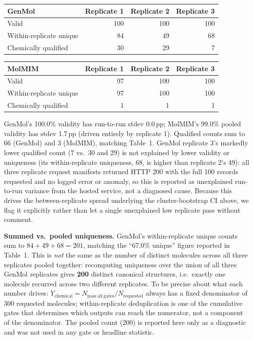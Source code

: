 \documentclass{article}
\begin{document}
\begin{table}[h]
\centering
\footnotesize
\begin{tabular}{lrrr}
\toprule
GenMol & Replicate 1 & Replicate 2 & Replicate 3 \\
\midrule
Valid & 100 & 100 & 100 \\
Within-replicate unique & 84 & 49 & 68 \\
Chemically qualified & 30 & 29 & 7 \\
\bottomrule
\end{tabular}
\hspace{1em}
\begin{tabular}{lrrr}
\toprule
MolMIM & Replicate 1 & Replicate 2 & Replicate 3 \\
\midrule
Valid & 97 & 100 & 100 \\
Within-replicate unique & 97 & 100 & 100 \\
Chemically qualified & 1 & 1 & 1 \\
\bottomrule
\end{tabular}
\end{table}

GenMol's 100.0\% validity has run-to-run stdev 0.0\,pp; MolMIM's 99.0\% pooled validity has stdev 1.7\,pp (driven entirely by replicate 1). Qualified counts sum to 66 (GenMol) and 3 (MolMIM), matching Table~1. GenMol replicate 3's markedly lower qualified count (7 vs.\ 30 and 29) is not explained by lower validity or uniqueness (its within-replicate uniqueness, 68, is higher than replicate 2's 49): all three replicate request manifests returned HTTP 200 with the full 100 records requested and no logged error or anomaly, so this is reported as unexplained run-to-run variance from the hosted service, not a diagnosed cause. Because this drives the between-replicate spread underlying the cluster-bootstrap CI above, we flag it explicitly rather than let a single unexplained low replicate pass without comment.

\textbf{Summed vs.\ pooled uniqueness.} GenMol's within-replicate unique counts sum to $84+49+68=201$, matching the ``67.0\% unique'' figure reported in Table~1. This is \emph{not} the same as the number of distinct molecules across all three replicates pooled together: recomputing uniqueness over the union of all three GenMol replicates gives \textbf{200} distinct canonical structures, i.e.\ exactly one molecule recurred across two different replicates. To be precise about what each number drives: $Y_{\mathrm{chemical}} = N_{\mathrm{pass\ all\ gates}}/N_{\mathrm{requested}}$ always has a fixed denominator of 300 requested molecules; within-replicate deduplication is one of the cumulative gates that determines which outputs can reach the numerator, not a component of the denominator. The pooled count (200) is reported here only as a diagnostic and was not used in any gate or headline statistic.
\end{document}
